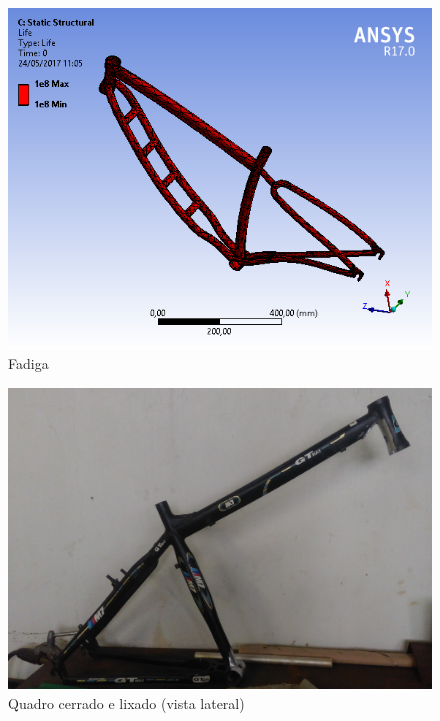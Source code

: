 	\graphicspath{{figuras/}}
	\begin{figure}[h!]
		\centering
		\includegraphics[scale=0.60]{inter_fadiga.png}
		\caption{Fadiga}
		\label{img:inter_fadiga}
	\end{figure}
	
	\graphicspath{{figuras/}}
	\begin{figure}[h!]
		\centering
		\includegraphics[scale=0.12]{quadro_cerrado_lateral.jpg}
		\caption{Quadro cerrado e lixado (vista lateral)}
		\label{img:quadro_cerrado_lateral}
	\end{figure}
	
